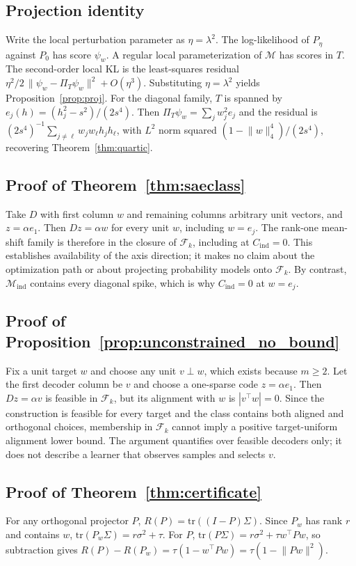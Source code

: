 \documentclass{article}
\theoremstyle{plain}
\newcommand{\Mind}{\mathcal{M}_{\mathrm{ind}}}
\begin{document}
{\subsection{Projection identity}
\label{app:proj}
Write the local perturbation parameter as $\eta=\lambda^2$. The log-likelihood of $P_\eta$ against $P_0$ has score $\psi_w$. A regular local parameterization of $\mathcal{M}$ has scores in $T$. The second-order local KL is the least-squares residual $\eta^2/2\,\lVert\psi_w-\Pi_T\psi_w\rVert^2+O(\eta^3)$. Substituting $\eta=\lambda^2$ yields Proposition~\ref{prop:proj}. For the diagonal family, $T$ is spanned by $e_j(h)=(h_j^2-s^2)/(2s^4)$. Then $\Pi_T\psi_w=\sum_j w_j^2 e_j$ and the residual is $(2s^4)^{-1}\sum_{j\neq\ell}w_j w_\ell h_j h_\ell$, with $L^2$ norm squared $(1-\lVert w\rVert_4^4)/(2s^4)$, recovering Theorem~\ref{thm:quartic}.

\subsection{Proof of Theorem~\ref{thm:saeclass}}
Take $D$ with first column $w$ and remaining columns arbitrary unit vectors, and $z=\alpha e_1$. Then $Dz=\alpha w$ for every unit $w$, including $w=e_j$. The rank-one mean-shift family is therefore in the closure of $\mathcal{F}_k$, including at $C_{\mathrm{ind}}=0$. This establishes availability of the axis direction; it makes no claim about the optimization path or about projecting probability models onto $\mathcal{F}_k$. By contrast, $\Mind$ contains every diagonal spike, which is why $C_{\mathrm{ind}}=0$ at $w=e_j$.

\subsection{Proof of Proposition~\ref{prop:unconstrained_no_bound}}
Fix a unit target $w$ and choose any unit $v\perp w$, which exists because $m\ge2$. Let the first decoder column be $v$ and choose a one-sparse code $z=\alpha e_1$. Then $Dz=\alpha v$ is feasible in $\mathcal{F}_k$, but its alignment with $w$ is $|v^\top w|=0$. Since the construction is feasible for every target and the class contains both aligned and orthogonal choices, membership in $\mathcal{F}_k$ cannot imply a positive target-uniform alignment lower bound. The argument quantifies over feasible decoders only; it does not describe a learner that observes samples and selects $v$.

\subsection{Proof of Theorem~\ref{thm:certificate}}
For any orthogonal projector $P$, $R(P)=\mathrm{tr}((I-P)\Sigma)$. Since $P_w$ has rank $r$ and contains $w$, $\mathrm{tr}(P_w\Sigma)=r\sigma^2+\tau$. For $P$, $\mathrm{tr}(P\Sigma)=r\sigma^2+\tau w^{\top}Pw$, so subtraction gives $R(P)-R(P_w)=\tau(1-w^{\top}Pw)=\tau(1-\lVert Pw\rVert^2)$.

}
\end{document}
